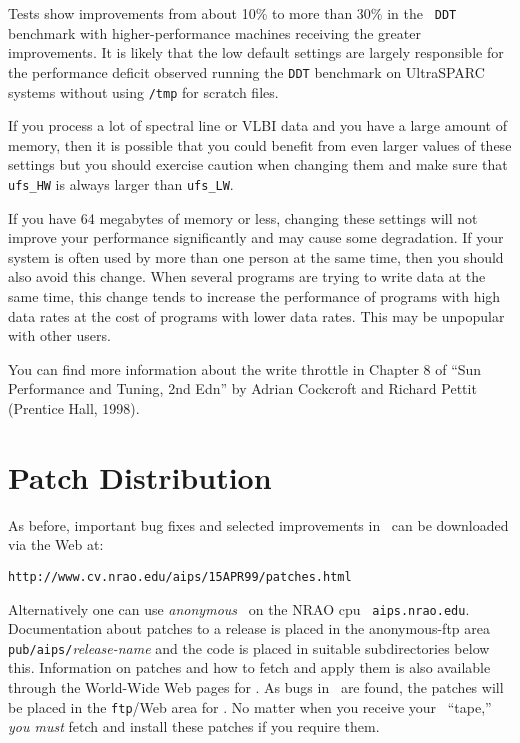 Tests show improvements from about 10\% to more than 30\% in the {\tt
DDT} benchmark with higher-performance machines receiving the greater
improvements. It is likely that the low default settings are largely
responsible for the performance deficit observed running the {\tt DDT}
benchmark on UltraSPARC systems without using {\tt /tmp} for scratch
files.

If you process a lot of spectral line or VLBI data and you have a
large amount of memory, then it is possible that you could benefit
from even larger values of these settings but you should exercise
caution when changing them and make sure that {\tt ufs\_HW} is always
larger than {\tt ufs\_LW}\@.

If you have 64 megabytes of memory or less, changing these settings
will not improve your performance significantly and may cause some
degradation. If your system is often used by more than one person at
the same time, then you should also avoid this change. When several
programs are trying to write data at the same time, this change tends
to increase the performance of programs with high data rates at the
cost of programs with lower data rates.  This may be unpopular with
other users.

You can find more information about the write throttle in Chapter 8 of
``Sun Performance and Tuning, 2nd Edn'' by Adrian Cockcroft and
Richard Pettit (Prentice Hall, 1998).

\section{Patch Distribution}

As before, important bug fixes and selected improvements in
\RELEASENAME\ can be downloaded via the Web at:

\begin{center}
\vskip -10pt
{\tt http://www.cv.nrao.edu/aips/15APR99/patches.html}
\vskip -10pt
\end{center}

Alternatively one can use {\it anonymous} \ftp\ on the NRAO cpu {\tt
aips.nrao.edu}.  Documentation about patches to a release is placed
in the anonymous-ftp area {\tt pub/aips/}{\it release-name} and the
code is placed in suitable subdirectories below this. Information on
patches and how to fetch and apply them is also available through the
World-Wide Web pages for \hbox{\AIPS}.  As bugs in \RELEASENAME\ are
found, the patches will be placed in the {\tt ftp}/Web area for
\hbox{{\RELEASENAME}}.  No matter when you receive your \RELEASENAME\
``tape,'' {\it you must} fetch and install these patches if you
require them.

